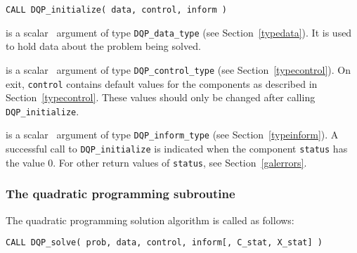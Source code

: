 \documentclass{galahad}
\newcommand{\packagename}{DQP}
\begin{document}
\hspace{8mm}
{\tt CALL \packagename\_initialize( data, control, inform )}

\vspace*{-3mm}
\begin{description}

 is a scalar \intentinout\ argument of type
{\tt \packagename\_data\_type}
(see Section~\ref{typedata}). It is used to hold data about the problem being
solved.

 is a scalar \intentout\ argument of type
{\tt \packagename\_control\_type}
(see Section~\ref{typecontrol}).
On exit, {\tt control} contains default values for the components as
described in Section~\ref{typecontrol}.
These values should only be changed after calling
{\tt \packagename\_initialize}.

 is a scalar \intentout\ argument of type
{\tt \packagename\_inform\_type}
(see Section~\ref{typeinform}). A successful call to
{\tt \packagename\_initialize}
is indicated when the  component {\tt status} has the value 0.
For other return values of {\tt status}, see Section~\ref{galerrors}.

\end{description}


\subsubsection{The quadratic programming subroutine}\label{qps}
The quadratic programming solution algorithm is called as follows:
\vspace*{1mm}

\hspace{8mm}
{\tt CALL \packagename\_solve( prob, data, control, inform[, C\_stat, X\_stat] )}
\end{document}
